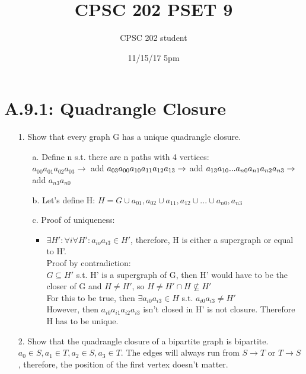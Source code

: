 \documentclass[12pt]{article}
\title{CPSC 202 PSET 9}
\author{CPSC 202 student}
\date{11/15/17 5pm}
\begin{document}
\maketitle

\section*{A.9.1: Quadrangle Closure}
\begin{enumerate}
  \item[1.] Show that every graph G has a unique quadrangle closure.
    \begin{enumerate}
      \item[a.] Define n s.t. there are n paths with 4 vertices:
        \\ $a_{00}a_{01}a_{02}a_{03}\rightarrow$ add $a_{03}a_{00}
        \\ a_{10}a_{11}a_{12}a_{13}\rightarrow$ add $a_{13}a_{10}
        \\ ...
        \\ a_{n0}a_{n1}a_{n2}a_{n3}\rightarrow$ add $a_{n3}a_{n0}$
      \item[b.] Let's define H: $H = G\cup {a_{01},a_{02}}\cup{a_{11},a_{12}}\cup ... \cup{a_{n0},a_{n3}}$
      \item[c.] Proof of uniqueness:
        \begin{itemize}
          \item $\exists H': \forall i\forall H' : {a_{io}a_{i3}}\in H'$, therefore, H is either a supergraph or equal to H'.
            \\ Proof by contradiction:
            \\ $G\subseteq H'$ s.t. H' is a supergraph of G, then H' would have to be the closer of G and $H \neq H'$, so $H\neq H' \cap H\nsubseteq H'$
            \\ For this to be true, then $\exists a_{i0}a_{i3} \in H$ s.t. ${a_{i0}a_{i3}} \neq H'$
            \\ However, then $a_{i0}a_{i1}a_{i2}a_{i3}$ isn't closed in H' is not closure. Therefore H has to be unique.
        \end{itemize}
    \end{enumerate}
  \item[2.] Show that the quadrangle closure of a bipartite graph is bipartite.
    \\ $a_0\in S, a_1\in T, a_2\in S, a_3\in T.$ The edges will always run from $S\rightarrow T$ or $T\rightarrow S$, therefore, the position of the first vertex doesn't matter. 
\end{enumerate}
\end{document}
